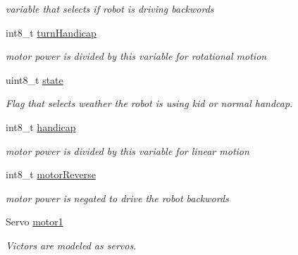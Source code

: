 \begin{DoxyCompactItemize}
\begin{DoxyCompactList}\small\item\em variable that selects if robot is driving backwords \end{DoxyCompactList}\item 
\mbox{\label{class_new_omni_drive_a405c32662c2d74af0c0281426565ff26}} 
int8\+\_\+t \mbox{\hyperlink{class_new_omni_drive_a405c32662c2d74af0c0281426565ff26}{turn\+Handicap}}
\begin{DoxyCompactList}\small\item\em motor power is divided by this variable for rotational motion \end{DoxyCompactList}\item 
\mbox{\label{class_new_omni_drive_adda5dd62e14f2f4d83d384fcd6de59f1}} 
uint8\+\_\+t \mbox{\hyperlink{class_new_omni_drive_adda5dd62e14f2f4d83d384fcd6de59f1}{state}}
\begin{DoxyCompactList}\small\item\em Flag that selects weather the robot is using kid or normal handcap. \end{DoxyCompactList}\item 
\mbox{\label{class_new_omni_drive_a1b01aea581c9e63e6e5ee986530e55ae}} 
int8\+\_\+t \mbox{\hyperlink{class_new_omni_drive_a1b01aea581c9e63e6e5ee986530e55ae}{handicap}}
\begin{DoxyCompactList}\small\item\em motor power is divided by this variable for linear motion \end{DoxyCompactList}\item 
\mbox{\label{class_new_omni_drive_ac11c87087afd9c322833372069e99255}} 
int8\+\_\+t \mbox{\hyperlink{class_new_omni_drive_ac11c87087afd9c322833372069e99255}{motor\+Reverse}}
\begin{DoxyCompactList}\small\item\em motor power is negated to drive the robot backwords \end{DoxyCompactList}\item 
\mbox{\label{class_new_omni_drive_a99ea81e5a6c1bbdaaab8d75de66a7f07}} 
Servo \mbox{\hyperlink{class_new_omni_drive_a99ea81e5a6c1bbdaaab8d75de66a7f07}{motor1}}
\begin{DoxyCompactList}\small\item\em Victors are modeled as servos. \end{DoxyCompactList}\item 

\end{DoxyCompactItemize}
